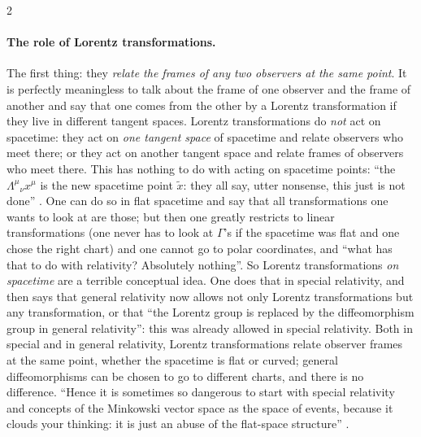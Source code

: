 \begin{paracol}{2}
\paragraph{The role of Lorentz transformations.} The first thing: they \emph{relate the frames of any two observers at the same point}. It is perfectly meaningless to talk about the frame of one observer and the frame of another and say that one comes from the other by a Lorentz transformation if they live in different tangent spaces. Lorentz transformations do \emph{not} act on spacetime: they act on \emph{one tangent space} of spacetime and relate observers who meet there; or they act on another tangent space and relate frames of observers who meet there. This has nothing to do with acting on spacetime points: ``the $\Lambda^\mu{}_\nu x^\mu$ is the new spacetime point $\tilde x$: they all say, utter nonsense, this just is not done'' .
One can do so in flat spacetime and say that all transformations one wants to look at are those; but then one greatly restricts to linear transformations (one never has to look at $\Gamma$'s if the spacetime was flat and one chose the right chart) and one cannot go to polar coordinates, and ``what has that to do with relativity? Absolutely nothing''. So Lorentz transformations \emph{on spacetime} are a terrible conceptual idea. One does that in special relativity, and then says that general relativity now allows not only Lorentz transformations but any transformation, or that ``the Lorentz group is replaced by the diffeomorphism group in general relativity'': this was already allowed in special relativity. Both in special and in general relativity, Lorentz transformations relate observer frames at the same point, whether the spacetime is flat or curved; general diffeomorphisms can be chosen to go to different charts, and there is no difference. ``Hence it is sometimes so dangerous to start with special relativity and concepts of the Minkowski vector space as the space of events, because it clouds your thinking: it is just an abuse of the flat-space structure'' .


\end{paracol}
